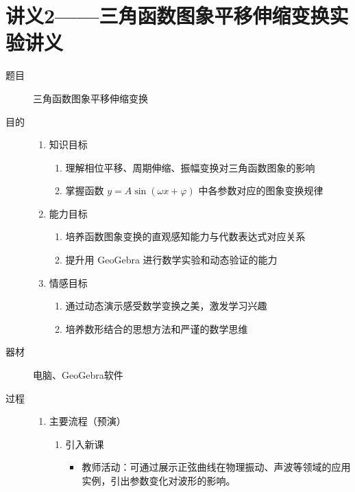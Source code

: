 \section{讲义2——三角函数图象平移伸缩变换实验讲义}
\begin{description}
  \item[题目]\hspace*{2em} 三角函数图象平移伸缩变换
  \item[目的] \mbox{} \vspace*{-1.8em}
    \begin{enumerate}
      \item 知识目标
        \begin{enumerate}
          \item 理解相位平移、周期伸缩、振幅变换对三角函数图象的影响
          \item 掌握函数 \(y = A\sin \left( {\omega x + \varphi }\right)\) 中各参数对应的图象变换规律
        \end{enumerate}
      \item 能力目标
        \begin{enumerate}
          \item 培养函数图象变换的直观感知能力与代数表达式对应关系
          \item 提升用 GeoGebra 进行数学实验和动态验证的能力
        \end{enumerate}
      \item 情感目标
        \begin{enumerate}
          \item 通过动态演示感受数学变换之美，激发学习兴趣
          \item 培养数形结合的思想方法和严谨的数学思维
        \end{enumerate}
    \end{enumerate}
  \item[器材] \hspace*{2em} 电脑、GeoGebra软件
  \item[过程] \mbox{} \vspace{-1.8em}
    \begin{enumerate}[label=(\zhnum*)]
      \item 主要流程（预演）
        \begin{enumerate}[1.]
          \item 引入新课
          \begin{itemize}
              \item 教师活动：可通过展示正弦曲线在物理振动、声波等领域的应用实例，引出参数变化对波形的影响。

\end{itemize}
\end{enumerate}
\end{enumerate}
\end{description}
